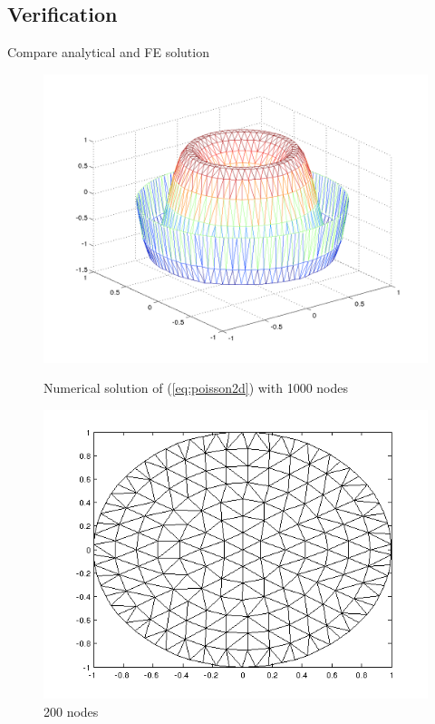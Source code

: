 \documentclass[paper=a4, fontsize=11pt]{scrartcl} %
\begin{document}
\subsection{Verification}
Compare analytical and FE solution
\begin{figure}[!htb]
  \includegraphics[width=\linewidth]{2h1000.png}
  \caption{Numerical solution of (\ref{eq:poisson2d}) with 1000 nodes}\label{fig:2h1000}
\endminipage\hfill
{}
  \includegraphics[width=\linewidth]{2d200.png}
  \caption{200 nodes}\label{fig:2d200}
\endminipage\hfill
\end{figure}
\end{document}
